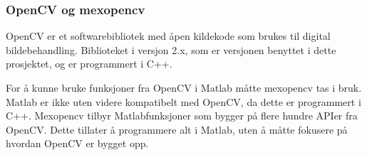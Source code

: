 \subsubsection{OpenCV og mexopencv}
OpenCV er et softwarebibliotek med åpen kildekode som brukes til digital bildebehandling. Biblioteket i versjon 2.x, som er versjonen benyttet i dette prosjektet, og er programmert i C++. \cite{docs:opencv}

For å kunne bruke funksjoner fra OpenCV i Matlab måtte mexopencv tas i bruk. Matlab er ikke uten videre kompatibelt med OpenCV, da dette er programmert i C++. Mexopencv tilbyr Matlabfunksjoner som bygger på flere hundre APIer fra OpenCV. \cite{mexopencv} Dette tillater å programmere alt i Matlab, uten å måtte fokusere på hvordan OpenCV er bygget opp. 
